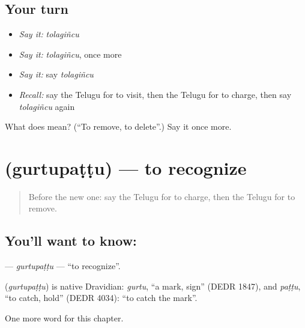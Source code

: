 \subsection*{Your turn}
\begin{itemize}
\raggedright
  \item \emph{Say it:} \emph{tolagiñcu}
  \item \emph{Say it:} \emph{tolagiñcu}, once more
  \item \emph{Say it:} say \emph{tolagiñcu}
  \item \emph{Recall:} say the Telugu for to visit, then the Telugu for to charge, then say \emph{tolagiñcu} again
\end{itemize}

\begin{tcolorbox}[breakable,colback=teal!4,colframe=teal!35!black,title={Before you move on}]
What does  mean? (\textquotedblleft{}To remove, to delete\textquotedblright{}.) Say it once more.
\end{tcolorbox}
\section[\texorpdfstring{\te{గుర్తుపట్టు} (gurtupaṭṭu)}{గుర్తుపట్టు (gurtupaṭṭu)}]{ (gurtupaṭṭu) — to recognize}

\label{lesson:TE-C283-gurtupattu}



\begin{quote}
Before the new one: say the Telugu for to charge, then the Telugu for to remove.
\end{quote}

\subsection*{You'll want to know: }
\textbf{} — \emph{gurtupaṭṭu} — \textquotedblleft{}to recognize\textquotedblright{}.

\begin{cousinweb}
\textbf{} (\emph{gurtupaṭṭu}) is native Dravidian: \emph{gurtu}, \textquotedblleft{}a mark, sign\textquotedblright{} (DEDR 1847), and \emph{paṭṭu}, \textquotedblleft{}to catch, hold\textquotedblright{} (DEDR 4034): \textquotedblleft{}to catch the mark\textquotedblright{}.
\end{cousinweb}

\begin{grammarlens}[title={What you've built}]
One more word for this chapter.
\end{grammarlens}

